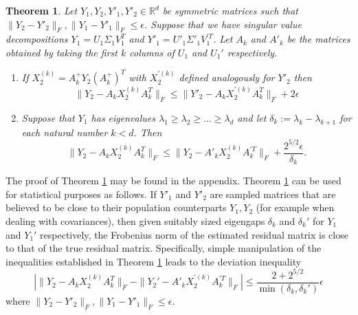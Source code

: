 \documentclass[a4]{article}
\newtheorem{thm}{Theorem}
\newcommand{\+}[1]{\mathbf{#1}}
\newcommand{\R}{\mathbb{R}}
\newcommand{\norm}[1]{\|#1\|}
\begin{document}
\begin{thm} \label{thm:SVDperturb} Let $Y_{1}, Y_{2}, Y'_{1}, Y'_{2} \in \R^{d}$ be symmetric matrices such that $\norm{Y_{2} - Y'_{2}}_{F}, \norm{Y_{1} - Y'_{1}}_{F} \leq \epsilon$. Suppose that we have singular value decompositions $Y_{1} = U_{1}\Sigma_{1}V_{1}^{T}$ and $Y'_{1} = U'_{1}\Sigma'_{1}V_{1}^{'T}$. Let $A_{k}$ and $A'_{k}$ be the matrices obtained by taking the first $k$ columns of $U_{1}$ and $U_{1}'$ respectively.
\begin{enumerate}
\item If $X_{2}^{(k)} = A_{k}^{+}Y_{2}(A_{k}^{+})^{T}$ with $X_{2}^{'(k)}$ defined analogously for $Y'_{2}$ then
\[ \norm{Y_{2} - A_{k}X_{2}^{(k)}A_{k}^{T}}_{F} \leq \norm{Y'_{2} - A_{k}X^{'(k)}_{2}A_{k}^{T}}_{F} + 2\epsilon \]
\item Suppose that $Y_{1}$ has eigenvalues $\lambda_{1} \geq \lambda_{2} \geq \dots \geq \lambda_{d}$ and let $\delta_{k} := \lambda_{k} - \lambda_{k + 1}$ for each natural number $k < d$. Then
\[ \norm{Y_{2} - A_{k}X_{2}^{(k)}A_{k}^{T}}_{F} \leq \norm{Y_{2} - A'_{k}X_{2}^{(k)}A_{k}^{'T}}_{F} + \frac{2^{5/2} \epsilon}{\delta_{k}}.\] 
\end{enumerate}
\end{thm}

The proof of Theorem \ref{thm:SVDperturb} may be found in the appendix. Theorem \ref{thm:SVDperturb} can be used for statistical purposes as follows. If $Y'_{1}$ and $Y'_{2}$ are sampled matrices that are believed to be close to their population counterparts $Y_{1}, Y_{2}$ (for example when dealing with covariances), then given suitably sized eigengaps $\delta_{k}$ and $\delta_{k}'$ for $Y_{1}$ and $Y_{1}'$ respectively, the Frobenius norm of the estimated residual matrix is close to that of the true residual matrix. Specifically, simple manipulation of the inequalities established in Theorem \ref{thm:SVDperturb} leads to the deviation inequality
\[ |\norm{Y_{2} - A_{k}X_{2}^{(k)}A_{k}^{T}}_{F} - \norm{Y_{2}' - A'_{k}X_{2}^{'(k)}A_{k}^{'T}}_{F}| \leq \frac{2 + 2^{5/2}}{\min(\delta_{k}, \delta_{k}')}\epsilon \] where $\norm{Y_{2} - Y'_{2}}_{F}, \norm{Y_{1} - Y'_{1}}_{F} \leq \epsilon$. 
\end{document}
